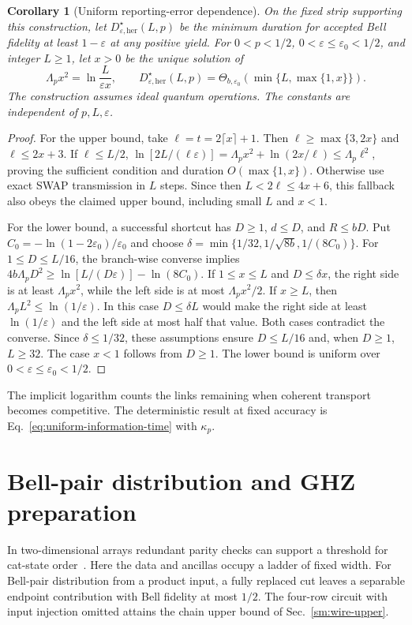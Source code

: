 \documentclass[aps,prl,twocolumn,superscriptaddress,longbibliography,reprint,floatfix]{revtex4-2}
\newcommand{\eps}{\varepsilon}
\newtheorem{corollary}{Corollary}
\begin{document}
\begin{corollary}[Uniform reporting-error dependence]
On the fixed strip supporting this construction, let
$D_{\eps,\mathrm{her}}^{\star}(L,p)$ be the minimum duration for accepted
Bell fidelity at least $1-\eps$ at any positive yield.
For $0<p<1/2$, $0<\eps\le\eps_0<1/2$, and integer $L\ge1$, let
$x>0$ be the unique solution of
\begin{equation}
 \Lambda_p x^2=\ln\frac{L}{\eps x},
 \qquad
 D_{\eps,\mathrm{her}}^{\star}(L,p)
   =\Theta_{b,\eps_0}\!\left(\min\{L,\max\{1,x\}\}\right).
 \label{eq:unanimity-uniform}
\end{equation}
The construction assumes ideal quantum operations. The constants are
independent of $p,L,\eps$.
\end{corollary}
\begin{proof}
For the upper bound, take $\ell=t=2\lceil x\rceil+1$.
Then $\ell\ge\max\{3,2x\}$ and $\ell\le2x+3$. If $\ell\le L/2$,
$\ln[2L/(\ell\eps)]=\Lambda_p x^2+\ln(2x/\ell)
\le\Lambda_p\ell^2$, proving the sufficient condition and
duration $O(\max\{1,x\})$. Otherwise use exact SWAP transmission
in $L$ steps. Since then $L<2\ell\le4x+6$, this fallback also obeys
the claimed upper bound, including small $L$ and $x<1$.

For the lower bound, a successful shortcut has $D\ge1$, $d\le D$,
and $R\le bD$. Put
$C_0=-\ln(1-2\eps_0)/\eps_0$ and choose
$\delta=\min\{1/32,1/\sqrt{8b},1/(8C_0)\}$.
For $1\le D\le L/16$, the branch-wise converse implies
$4b\Lambda_p D^2\ge\ln[L/(D\eps)]-\ln(8C_0)$.
If $1\le x\le L$ and $D\le\delta x$, the right side is at least
$\Lambda_p x^2$, while the left side is at most $\Lambda_p x^2/2$.
If $x\ge L$, then $\Lambda_p L^2\le\ln(1/\eps)$. In this case
$D\le\delta L$ would make the right side at least $\ln(1/\eps)$
and the left side at most half that value. Both cases contradict the
converse. Since $\delta\le1/32$, these assumptions ensure
$D\le L/16$ and, when $D\ge1$, $L\ge32$. The case $x<1$ follows
from $D\ge1$. The lower bound is uniform over $0<\eps\le\eps_0<1/2$.
\end{proof}

The implicit logarithm counts the links remaining when coherent
transport becomes competitive. The deterministic result at fixed
accuracy is Eq.~\eqref{eq:uniform-information-time} with $\kappa_p$.

\FloatBarrier
\section{Bell-pair distribution and GHZ preparation}
\label{sm:ghz}
In two-dimensional arrays redundant parity checks can support a threshold for cat-state order~\cite{Zhu2023,Chen2025}. Here the data and ancillas occupy a ladder of fixed width.
For Bell-pair distribution from a product input, a fully replaced
cut leaves a separable endpoint contribution with Bell fidelity at most $1/2$. The four-row circuit with input
injection omitted attains the chain upper bound of Sec.~\ref{sm:wire-upper}.
\end{document}

